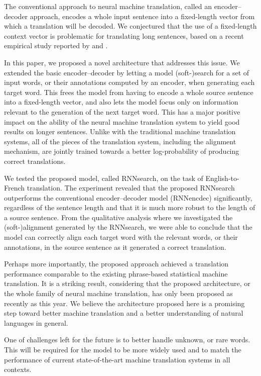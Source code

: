 \documentclass{article} %
\begin{document}
The conventional approach to neural machine translation, called an
encoder--decoder approach, encodes a whole input sentence into a fixed-length
vector from which a translation will be decoded. We conjectured that the use of
a fixed-length context vector is problematic for translating long sentences,
based on a recent empirical study reported by \citet{Cho2014a} and
\citet{Pouget2014}.

In this paper, we proposed a novel architecture that addresses this issue. We
extended the basic encoder--decoder by letting a model \mbox{(soft-)search} for
a set of input words, or their annotations computed by an encoder, when
generating each target word. This frees the model from having to encode a whole
source sentence into a fixed-length vector, and also lets the model focus only
on information relevant to the generation of the next target word. This has a
major positive impact on the ability of the neural machine translation system to
yield good results on longer sentences. Unlike with the traditional machine
translation systems, all of the pieces of the translation system, including the
alignment mechanism, are jointly trained towards a better log-probability of
producing correct translations.

We tested the proposed model, called RNNsearch, on the task of English-to-French
translation. The experiment revealed that the proposed RNNsearch outperforms the
conventional encoder--decoder model (RNNencdec) significantly, regardless of the
sentence length and that it is much more robust to the length of a source
sentence. From the qualitative analysis where we investigated the
\mbox{(soft-)alignment} generated by the RNNsearch, we were able to conclude
that the model can correctly align each target word with the relevant words, or
their annotations, in the source sentence as it generated a correct translation.

Perhaps more importantly, the proposed approach achieved a translation
performance comparable to the existing phrase-based statistical machine
translation. It is a striking result, considering that the proposed
architecture, or the whole family of neural machine translation, has only been
proposed as recently as this year. We believe the architecture proposed here is
a promising step toward better machine translation and a better understanding of
natural languages in general.

One of challenges left for the future is to better handle unknown, or rare
words. This will be required for the model to be more widely used and to match
the performance of current state-of-the-art machine translation systems in all
contexts.
\end{document}
